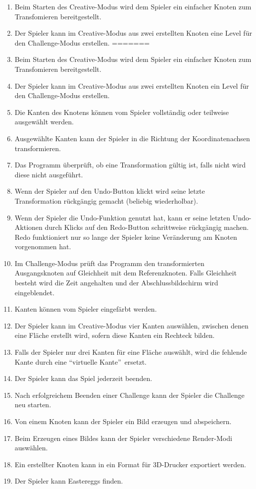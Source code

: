 \begin{enumerate}[resume]


\item Beim Starten des Creative-Modus wird dem Spieler ein einfacher Knoten zum Transfomieren bereitgestellt.
\item Der Spieler kann im Creative-Modus aus zwei erstellten Knoten eine Level für den Challenge-Modus erstellen.
=======
\item Beim Starten des Creative-Modus wird dem Spieler ein einfacher Knoten  zum Transfomieren bereitgestellt.
\item Der Spieler kann im Creative-Modus aus zwei erstellten Knoten ein Level für den Challenge-Modus erstellen.

\item Die Kanten des Knotens können vom Spieler vollständig oder teilweise ausgewählt werden.
\item Ausgewählte Kanten kann der Spieler in die Richtung der Koordinatenachsen transformieren.
\item Das Programm überprüft, ob eine Transformation gültig ist, falls nicht wird diese nicht ausgeführt.
\item Wenn der Spieler auf den Undo-Button klickt wird seine letzte Transformation rückgängig gemacht (beliebig wiederholbar). 
\item Wenn der Spieler die Undo-Funktion genutzt hat, kann er seine letzten Undo-Aktionen durch Klicks auf den Redo-Button schrittweise rückgängig machen. Redo funktioniert nur so lange der Spieler keine Veränderung am Knoten vorgenommen hat. %
\item Im Challenge-Modus prüft das Programm den transformierten Ausgangsknoten auf Gleichheit mit dem Referenzknoten. Falls Gleichheit besteht wird die Zeit angehalten und der Abschlussbildschirm wird eingeblendet.
\item Kanten können vom Spieler eingefärbt werden. %
\item Der Spieler kann im Creative-Modus vier Kanten auswählen, zwischen denen eine Fläche erstellt wird, sofern diese Kanten ein Rechteck bilden. %
\item Falls der Spieler nur drei Kanten für eine Fläche auswählt, wird  die fehlende Kante durch eine \textquotedblleft virtuelle Kante\textquotedblright~ersetzt.
\item Der Spieler kann das Spiel jederzeit beenden.
\item Nach erfolgreichem Beenden einer Challenge kann der Spieler die Challenge neu starten. %
\item Von einem Knoten kann der Spieler ein Bild erzeugen und abspeichern. %
\item Beim Erzeugen eines Bildes kann der Spieler verschiedene Render-Modi auswählen.
\item Ein erstellter Knoten kann in ein Format für 3D-Drucker exportiert werden. %
\item Der Spieler kann Eastereggs finden. %

\end{enumerate}

